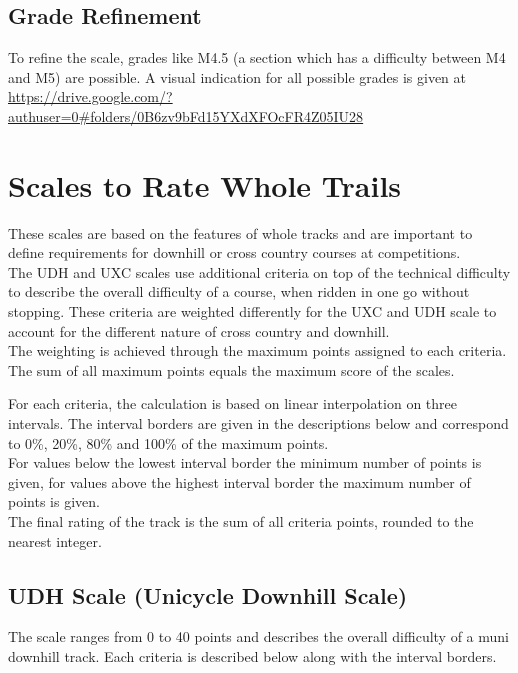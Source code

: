 \documentclass[a4paper,oneside]{scrartcl}
\begin{document}
\subsection{Grade Refinement}
To refine the scale, grades like M4.5 (a section which has a difficulty between
M4 and M5) are possible.
A visual indication for all possible grades is given at
\url{https://drive.google.com/?authuser=0#folders/0B6zv9bFd15YXdXFOcFR4Z05IU28}

\section{Scales to Rate Whole Trails}
\label{sec:muni-difficulty-udh-uxc}

These scales are based on the features of whole tracks and are important to
define requirements for downhill or cross country courses at competitions.\\
The UDH and UXC scales use additional criteria on top of the technical difficulty
to describe the overall difficulty of a course, when ridden in one go without stopping.
These criteria are weighted differently for the UXC and UDH scale to account for the
different nature of cross country and downhill.\\
The weighting is achieved through the maximum points assigned to each criteria. The sum
of all maximum points equals the maximum score of the scales.

For each criteria, the calculation is based on linear interpolation on three intervals.
The interval borders are given in the descriptions below and correspond to 0\%,
20\%, 80\% and 100\% of the maximum points.\\
For values below the lowest interval border the minimum number of points is
given, for values above the highest interval border the maximum number of points
is given.\\
The final rating of the track is the sum of all criteria points, rounded to the nearest integer.

\subsection{UDH Scale (Unicycle Downhill Scale)}
\label{sec:udh-scale}

The scale ranges from 0 to 40 points and describes the overall difficulty of a
muni downhill track. Each criteria is described below along with the
interval borders.
\end{document}
